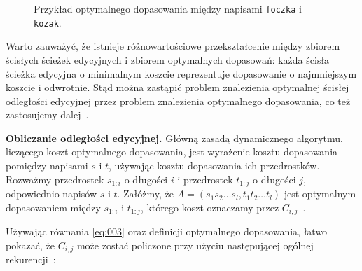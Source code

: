 \documentclass{praca1}
\begin{document}
\begin{figure}[width=80pt]
\centering
{}
\cprotect\caption{Przykład optymalnego dopasowania między napisami \verb|foczka| i \verb|kozak|.}\label{rys:001}
\end{figure}

Warto zauważyć, że istnieje różnowartościowe przekształcenie między zbiorem ścisłych ścieżek edycyjnych i zbiorem optymalnych dopasowań: każda ścisła ścieżka edycyjna o minimalnym koszcie reprezentuje dopasowanie o najmniejszym koszcie i odwrotnie. Stąd można zastąpić problem znalezienia optymalnej ścisłej odległości edycyjnej przez problem znalezienia optymalnego dopasowania, co też zastosujemy dalej~\cite{Boytsov2011:indexingmethods}.

\textbf{Obliczanie odległości edycyjnej.} Główną zasadą dynamicznego algorytmu, liczącego koszt optymalnego dopasowania, jest wyrażenie kosztu dopasowania pomiędzy napisami $s$ i $t$, używając kosztu dopasowania ich przedrostków. Rozważmy przedrostek $s_{1:i}$ o długości $i$ i przedrostek $t_{1:j}$ o długości $j$, odpowiednio napisów $s$ i $t$. Załóżmy, że $A = (s_1 s_2\ldots s_l, t_1 t_2 \ldots t_l)$ jest optymalnym dopasowaniem między $s_{1:i}$ i $t_{1:j}$, którego koszt oznaczamy przez $C_{i,j}$~\cite{Boytsov2011:indexingmethods}.

Używając równania \eqref{eq:003} oraz definicji optymalnego dopasowania, łatwo pokazać, że $C_{i,j}$ może zostać policzone przy użyciu następującej ogólnej rekurencji~\cite{Ukkonen1985:algorithmsforapprox}:
\end{document}
